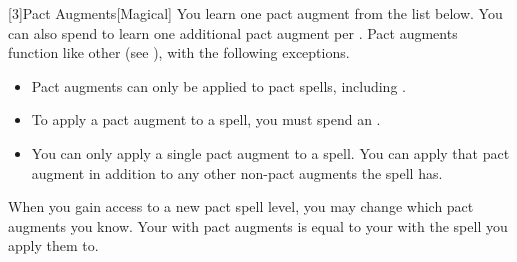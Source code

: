         [3]{Pact Augments}[Magical] You learn one pact augment from the list below.
        You can also spend  to learn one additional pact augment per .
        Pact augments function like other  (see ), with the following exceptions.
        \begin{itemize}
            \item Pact augments can only be applied to pact spells, including .
            \item To apply a pact augment to a spell, you must spend an .
            \item You can only apply a single pact augment to a spell.
                You can apply that pact augment in addition to any other non-pact augments the spell has.
        \end{itemize}
        When you gain access to a new pact spell level, you may change which pact augments you know.
        Your  with pact augments is equal to your  with the spell you apply them to.
